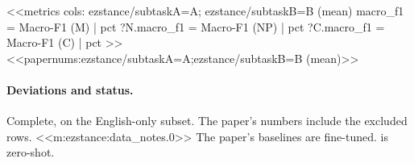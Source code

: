<<metrics
cols: ezstance/subtaskA=A; ezstance/subtaskB=B (mean)
macro_f1 = Macro-F1 (M) | pct
?N.macro_f1 = Macro-F1 (NP) | pct
?C.macro_f1 = Macro-F1 (C) | pct
>>
<<papernums:ezstance/subtaskA=A;ezstance/subtaskB=B (mean)>>

\paragraph{Deviations and status.} Complete, on the English-only subset. The paper's numbers include the excluded
rows. <<m:ezstance:data_notes.0>> The paper's baselines are fine-tuned. \jev{} is zero-shot.

